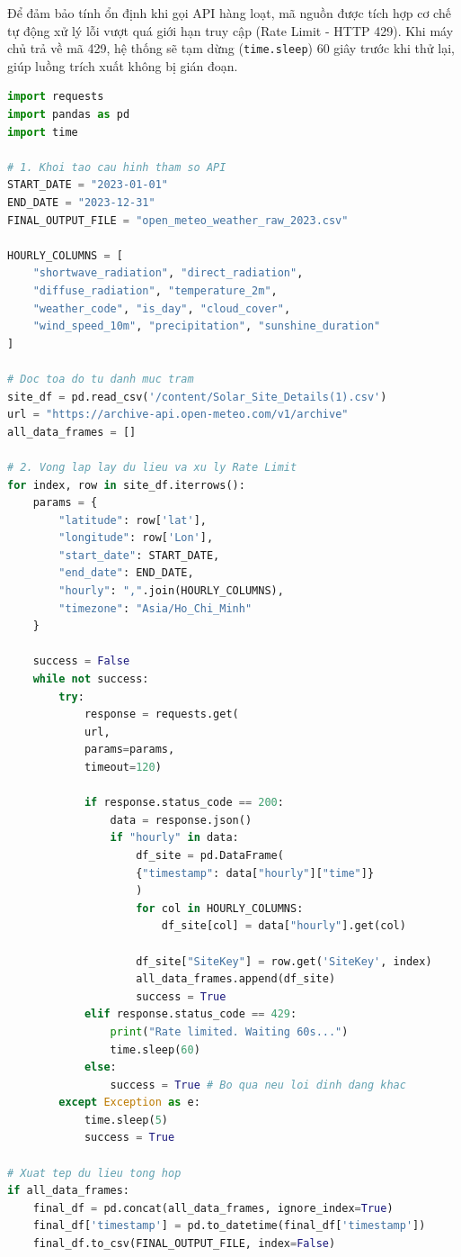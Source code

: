\documentclass[12pt, a4paper]{report}
\begin{document}
Để đảm bảo tính ổn định khi gọi API hàng loạt, mã nguồn được tích hợp cơ chế tự động xử lý lỗi vượt quá giới hạn truy cập (Rate Limit - HTTP 429). Khi máy chủ trả về mã 429, hệ thống sẽ tạm dừng (\texttt{time.sleep}) 60 giây trước khi thử lại, giúp luồng trích xuất không bị gián đoạn.

\begin{lstlisting}[language=Python, caption={Mã nguồn Python trích xuất dữ liệu khí tượng từ Open-Meteo API}, label={lst:api_weather}]
import requests
import pandas as pd
import time

# 1. Khoi tao cau hinh tham so API
START_DATE = "2023-01-01"
END_DATE = "2023-12-31"
FINAL_OUTPUT_FILE = "open_meteo_weather_raw_2023.csv"

HOURLY_COLUMNS = [
    "shortwave_radiation", "direct_radiation", 
    "diffuse_radiation", "temperature_2m", 
    "weather_code", "is_day", "cloud_cover",
    "wind_speed_10m", "precipitation", "sunshine_duration"
]

# Doc toa do tu danh muc tram
site_df = pd.read_csv('/content/Solar_Site_Details(1).csv')
url = "https://archive-api.open-meteo.com/v1/archive"
all_data_frames = []

# 2. Vong lap lay du lieu va xu ly Rate Limit
for index, row in site_df.iterrows():
    params = {
        "latitude": row['lat'],
        "longitude": row['Lon'],
        "start_date": START_DATE,
        "end_date": END_DATE,
        "hourly": ",".join(HOURLY_COLUMNS),
        "timezone": "Asia/Ho_Chi_Minh"
    }
    
    success = False
    while not success:
        try:
            response = requests.get(
            url, 
            params=params, 
            timeout=120)
            
            if response.status_code == 200:
                data = response.json()
                if "hourly" in data:
                    df_site = pd.DataFrame(
                    {"timestamp": data["hourly"]["time"]}
                    )
                    for col in HOURLY_COLUMNS:
                        df_site[col] = data["hourly"].get(col)
                    
                    df_site["SiteKey"] = row.get('SiteKey', index)
                    all_data_frames.append(df_site)
                    success = True
            elif response.status_code == 429:
                print("Rate limited. Waiting 60s...")
                time.sleep(60)
            else:
                success = True # Bo qua neu loi dinh dang khac
        except Exception as e:
            time.sleep(5)
            success = True

# Xuat tep du lieu tong hop
if all_data_frames:
    final_df = pd.concat(all_data_frames, ignore_index=True)
    final_df['timestamp'] = pd.to_datetime(final_df['timestamp'])
    final_df.to_csv(FINAL_OUTPUT_FILE, index=False)
\end{lstlisting}
\end{document}
